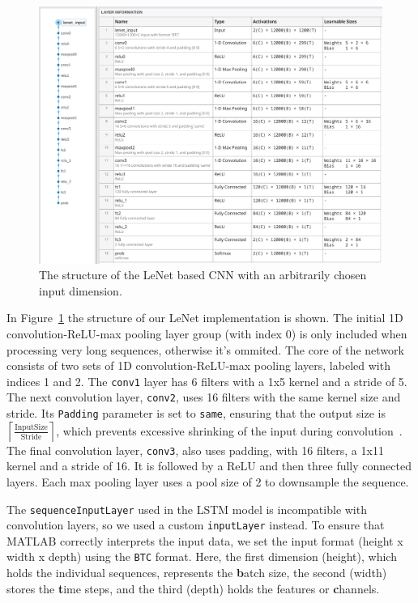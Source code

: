 \documentclass[a4paper,oneside,onecolumn,12pt]{book}
\begin{document}
	\begin{figure}[H]
	\begin{center}
		\includegraphics[width=\linewidth]{kep/lenet_structure.png}
		\caption{The structure of the LeNet based CNN with an arbitrarily chosen input dimension.}
		\label{fig:lenet_structure}
	\end{center}
	\end{figure}

	In Figure~\ref{fig:lenet_structure} the structure of our LeNet implementation is shown. The initial 1D convolution-ReLU-max pooling layer group (with index 0) is only included when processing very long sequences, otherwise it's ommited. The core of the network consists of two sets of 1D convolution-ReLU-max pooling layers, labeled with indices 1 and 2. The \texttt{conv1} layer has 6 filters with a 1x5 kernel and a stride of 5. The next convolution layer, \texttt{conv2}, uses 16 filters with the same kernel size and stride. Its \texttt{Padding} parameter is set to \texttt{same}, ensuring that the output size is $\left\lceil \frac{\text{InputSize}}{\text{Stride}} \right\rceil$, which prevents excessive shrinking of the input during convolution~\cite{1DCL}. The final convolution layer, \texttt{conv3}, also uses padding, with 16 filters, a 1x11 kernel and a stride of 16. It is followed by a ReLU and then three fully connected layers. Each max pooling layer uses a pool size of 2 to downsample the sequence.

	The \texttt{sequenceInputLayer} used in the LSTM model is incompatible with convolution layers, so we used a custom \texttt{inputLayer} instead. To ensure that MATLAB correctly interprets the input data, we set the input format (height x width x depth) using the \texttt{BTC} format. Here, the first dimension (height), which holds the individual sequences, represents the \textbf{b}atch size, the second (width) stores the \textbf{t}ime steps, and the third (depth) holds the features or \textbf{c}hannels.
\end{document}
